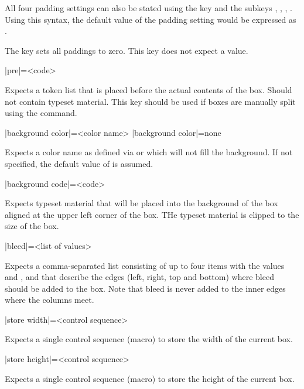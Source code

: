 \documentclass[a4paper]{article}
\begin{document}
All four padding settings can also be stated using the  key and the subkeys , , , . Using this syntax, the default value of the padding setting would be expressed as .

The key  sets all paddings to zero. This key does not expect a value.

\begin{macrodef}
|pre|={<code>}
\end{macrodef}
Expects a token list that is placed before the actual contents of the box. Should not contain typeset material. This key should be used if boxes are manually split using the \macro{\leporelloboxbreak} command.

\begin{macrodef}
|background color|={<color name>}
|background color|={none}
\end{macrodef}
Expects a color name as defined via  or  which will not fill the background. If not specified, the default value of  is assumed.

\begin{macrodef}
|background code|={<code>}
\end{macrodef}
Expects typeset material that will be placed into the background of the box aligned at the upper left corner of the box. THe typeset material is clipped to the size of the box.

\begin{macrodef}
|bleed|={<list of values>}
\end{macrodef}
Expects a comma-separated list consisting of up to four items with the values  and ,  and  that describe the edges (left, right, top and bottom) where bleed should be added to the box. Note that bleed is never added to the inner edges where the columns meet.

\begin{macrodef}
|store width|={<control sequence>}
\end{macrodef}
Expects a single control sequence (macro) to store the width of the current box.

\begin{macrodef}
|store height|={<control sequence>}
\end{macrodef}
Expects a single control sequence (macro) to store the height of the current box.
\end{document}
